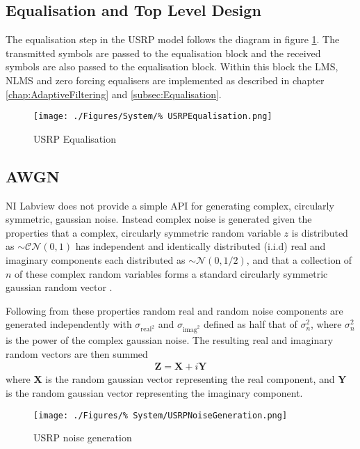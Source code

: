\subsection{Equalisation and Top Level Design}
The equalisation step in the USRP model follows %
the diagram in figure \ref{fig:USRPEqualisation}. The transmitted %
symbols are passed to the equalisation block and the received %
symbols are also passed to the equalisation block. Within this block %
the LMS, NLMS and zero forcing equalisers are implemented as %
described in chapter \ref{chap:AdaptiveFiltering} and %
\ref{subsec:Equalisation}.
\begin{figure}[ht]
	\centering
	\texttt{[image: ./Figures/System/\%
	USRPEqualisation.png]}
	\caption{USRP Equalisation}
	\label{fig:USRPEqualisation}
\end{figure}
\subsection{AWGN}
NI Labview does not provide a simple API for generating %
complex, circularly symmetric, gaussian noise. Instead %
complex noise is generated given the properties that %
a complex, circularly symmetric random variable $z$ is %
distributed as $\sim\mathcal{CN}(0,1)$ has independent %
and identically distributed (i.i.d) real and imaginary %
components each distributed as $\sim\mathcal{N}(0,1/2)$, %
and that a collection of $n$ of these complex random %
variables forms a standard circularly symmetric %
gaussian random vector \cite{Tse05}.

Following from these properties random real and %
random noise components are generated independently %
with $\sigma_{\text{real}^{2}}$ and $\sigma_{\text{imag}^{2}}$ %
defined as half that of $\sigma_{n}^{2}$, where $\sigma_{n}^{2}$ %
is the power of the complex gaussian noise. The resulting %
real and imaginary random vectors are then summed
\begin{align}
	\mathbf{Z} = \mathbf{X} + i\mathbf{Y}
\end{align}
where $\mathbf{X}$ is the random gaussian vector %
representing the real component, and $\mathbf{Y}$ %
is the random gaussian vector representing the %
imaginary component.

\begin{figure}[ht]
	\texttt{[image: ./Figures/\%
	System/USRPNoiseGeneration.png]}
	\caption{USRP noise generation}
	\label{fig:USRPNoiseGen}
\end{figure}

